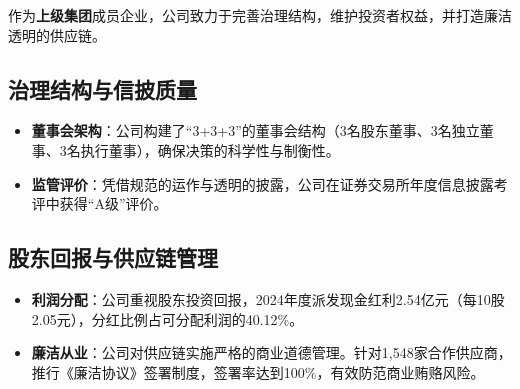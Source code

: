 \documentclass[a4paper,12pt]{article}
\begin{document}
作为\textbf{上级集团}成员企业，公司致力于完善治理结构，维护投资者权益，并打造廉洁透明的供应链。

\subsection{治理结构与信披质量}

\begin{itemize}
    \item \textbf{董事会架构}：公司构建了“3+3+3”的董事会结构（3名股东董事、3名独立董事、3名执行董事），确保决策的科学性与制衡性。
    \item \textbf{监管评价}：凭借规范的运作与透明的披露，公司在证券交易所年度信息披露考评中获得“A级”评价。
\end{itemize}

\subsection{股东回报与供应链管理}

\begin{itemize}
    \item \textbf{利润分配}：公司重视股东投资回报，2024年度派发现金红利2.54亿元（每10股2.05元），分红比例占可分配利润的40.12\%。
    \item \textbf{廉洁从业}：公司对供应链实施严格的商业道德管理。针对1,548家合作供应商，推行《廉洁协议》签署制度，签署率达到100\%，有效防范商业贿赂风险。
\end{itemize}
\end{document}
